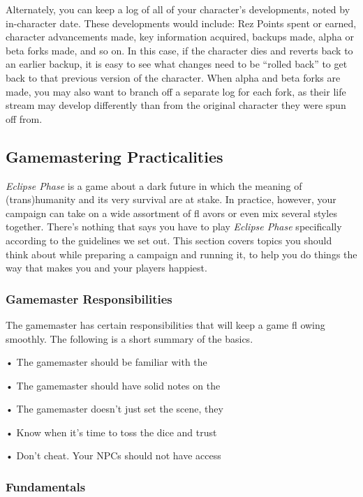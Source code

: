 Alternately, you can keep a log of all of your 
character's developments, noted by in-character 
date. These developments would include: Rez Points 
spent or earned, character advancements made, key 
information acquired, backups made, alpha or beta 
forks made, and so on. In this case, if the character 
dies and reverts back to an earlier backup, it is easy 
to see what changes need to be ``rolled back'' to get 
back to that previous version of the character. When 
alpha and beta forks are made, you may also want to 
branch off a separate log for each fork, as their life 
stream may develop differently than from the original 
character they were spun off from.

\subsection{Gamemastering Practicalities}

\textit{Eclipse Phase} is a game about a dark future in which 
the meaning of (trans)humanity and its very survival 
are at stake. In practice, however, your campaign can 
take on a wide assortment of fl avors or even mix 
several styles together. There's nothing that says you 
have to play \textit{Eclipse Phase} specifically according to 
the guidelines we set out. This section covers topics 
you should think about while preparing a campaign 
and running it, to help you do things the way that 
makes you and your players happiest.

\subsubsection{Gamemaster Responsibilities }

The gamemaster has certain responsibilities that will 
keep a game fl owing smoothly. The following is a 
short summary of the basics.

•  The gamemaster should be familiar with the 

•  The gamemaster should have solid notes on the 

•  The gamemaster doesn't just set the scene, they 

•  Know when it's time to toss the dice and trust 

•  Don't cheat. Your NPCs should not have access 

\subsubsection{Fundamentals}

